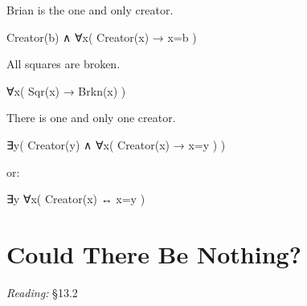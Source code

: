\documentclass[12pt]{extarticle}
\begin{document}
\begin{multicols*}{3}
Brian is the one and only creator.
 
\hspace{3mm} Creator(b) ∧ ∀x( Creator(x) → x=b )
 
All squares are broken.
 
\hspace{3mm} ∀x( Sqr(x) → Brkn(x) )
 
There is one and only one creator.
 
\hspace{3mm} ∃y( Creator(y) ∧ ∀x( Creator(x) → x=y ) )
 
\hspace{3mm} or:
 
\hspace{3mm} ∃y ∀x( Creator(x) ↔ x=y )
 
 
 
\section{Could There Be Nothing?}
 
\emph{Reading:} §13.2
 

\end{multicols*}
\end{document}
